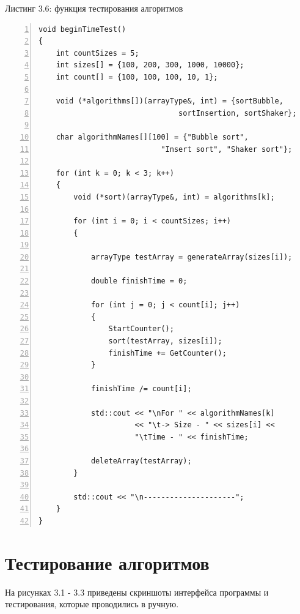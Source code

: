 \documentclass[12pt,a4paper]{report}
\begin{document}
\textrm{Листинг 3.6: функция тестирования алгоритмов}
\begin{lstlisting}[frame=single, numbers=left]
void beginTimeTest()
{
    int countSizes = 5;
    int sizes[] = {100, 200, 300, 1000, 10000};
    int count[] = {100, 100, 100, 10, 1};
    
    void (*algorithms[])(arrayType&, int) = {sortBubble, 
                                sortInsertion, sortShaker}; 
    
    char algorithmNames[][100] = {"Bubble sort", 
                            "Insert sort", "Shaker sort"};
    
    for (int k = 0; k < 3; k++)
    {
        void (*sort)(arrayType&, int) = algorithms[k];
    
        for (int i = 0; i < countSizes; i++)
        {

            arrayType testArray = generateArray(sizes[i]);
                
            double finishTime = 0;
    
            for (int j = 0; j < count[i]; j++)
            {
                StartCounter();
                sort(testArray, sizes[i]);
                finishTime += GetCounter();
            }
    
            finishTime /= count[i];
                
            std::cout << "\nFor " << algorithmNames[k] 
                      << "\t-> Size - " << sizes[i] << 
                      "\tTime - " << finishTime;
    
            deleteArray(testArray);
        }
    
        std::cout << "\n---------------------";
    }
}
\end{lstlisting}

\section{Тестирование алгоритмов}

На рисунках 3.1 - 3.3 приведены скриншоты интерфейса программы и тестирования, которые проводились в ручную.
\end{document}
